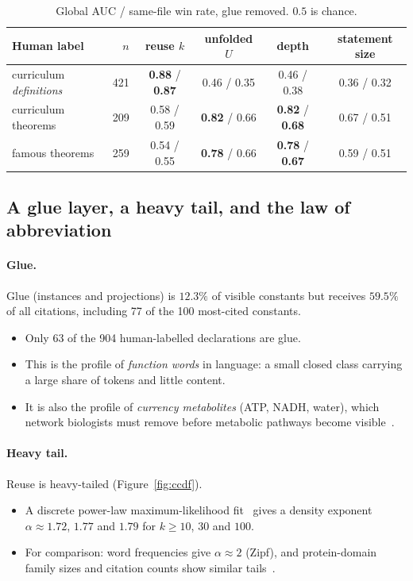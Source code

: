 \documentclass[11pt]{article}
\theoremstyle{remark}
\begin{document}
\begin{table}[t]
\centering\small
\begin{tabular}{lrcccc}
\toprule
Human label & $n$ & reuse $k$ & unfolded $U$ & depth & statement size \\
\midrule
curriculum \emph{definitions} & 421 & \textbf{0.88} / \textbf{0.87} & 0.46 / 0.35 & 0.46 / 0.38 & 0.36 / 0.32 \\
curriculum theorems & 209 & 0.58 / 0.59 & \textbf{0.82} / 0.66 & \textbf{0.82} / \textbf{0.68} & 0.67 / 0.51 \\
famous theorems & 259 & 0.54 / 0.55 & \textbf{0.78} / 0.66 & \textbf{0.78} / \textbf{0.67} & 0.59 / 0.51 \\
\bottomrule
\end{tabular}
\caption{Global AUC / same-file win rate, glue removed. $0.5$ is chance.}
\label{tab:auc}
\end{table}

\subsection{A glue layer, a heavy tail, and the law of abbreviation}

\paragraph{Glue.} Glue (instances and projections) is $12.3\%$ of visible constants but
receives $59.5\%$ of all citations, including 77 of the 100 most-cited constants.
\begin{itemize}
\item Only 63 of the 904 human-labelled declarations are glue.
\item This is the profile of \emph{function words} in language: a small closed class
  carrying a large share of tokens and little content.
\item It is also the profile of \emph{currency metabolites} (ATP, NADH, water), which
  network biologists must remove before metabolic pathways become visible~\cite{ma}.
\end{itemize}

\paragraph{Heavy tail.} Reuse is heavy-tailed (Figure~\ref{fig:ccdf}).
\begin{itemize}
\item A discrete power-law maximum-likelihood fit~\cite{clauset} gives a density exponent
  $\alpha\approx1.72$, $1.77$ and $1.79$ for $k\ge10$, $30$ and $100$.
\item For comparison: word frequencies give $\alpha\approx2$ (Zipf), and protein-domain
  family sizes and citation counts show similar tails~\cite{koonin,price}.
\end{itemize}
\end{document}
